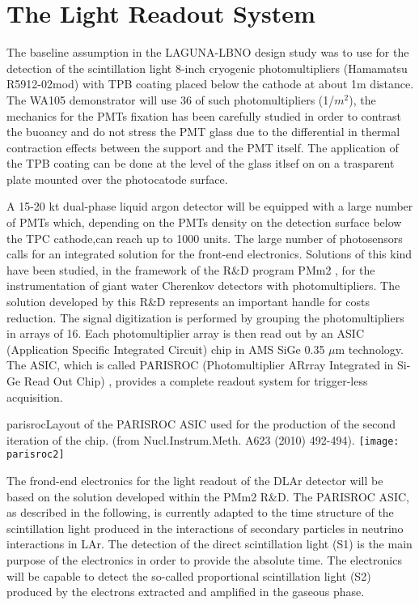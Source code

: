 \section{The Light Readout System} 
\label{sec:detectors-fd-alt-light}

The baseline assumption in the LAGUNA-LBNO design study was to use for the detection of the scintillation light 8-inch cryogenic photomultipliers (Hamamatsu R5912-02mod) with TPB coating placed below the cathode at about 1m distance. The WA105 demonstrator will use 36 of such photomultipliers (1/$m^2$), the mechanics for the PMTs fixation has been carefully studied in order to contrast the buoancy and do not stress the PMT glass due to the differential in thermal contraction effects between the support and the PMT itself. The application of the TPB coating can be done at the level of the glass itlsef on on a trasparent plate mounted over the photocatode surface.

A 15-20 kt dual-phase liquid argon detector will be equipped with a large number of PMTs which, depending on the PMTs density on the detection surface below the TPC cathode,can reach up to 1000 units. The large number of photosensors calls for an integrated solution for the front-end electronics.
Solutions of this kind have been studied, in the framework of the R\&D program PMm2 \cite{PMM2-1, PMM2-2}, for the instrumentation of giant water
Cherenkov detectors with photomultipliers. The solution developed by this R\&D represents an
important handle for costs reduction. The signal digitization is performed by grouping the
photomultipliers in arrays of 16. Each photomultiplier array is then read out by an ASIC
(Application Specific Integrated Circuit) chip in AMS SiGe 0.35 $\mu$m technology. The ASIC,
which is called PARISROC (Photomultiplier ARrray Integrated in Si-Ge Read Out Chip) 
\cite{Parisroc}, provides a complete readout system for trigger-less acquisition.

\begin{cdrfigure}{parisroc}{Layout of the PARISROC ASIC used for the production of the second iteration of the
chip. (from Nucl.Instrum.Meth. A623 (2010) 492-494).}
 \texttt{[image: parisroc2]}  
\end{cdrfigure}

The frond-end electronics for the light readout of the DLAr detector will be based on the solution 
developed within the PMm2 R\&D. The PARISROC ASIC, as described in the following, is currently adapted to the 
time structure of the scintillation light produced in the interactions of secondary particles in neutrino interactions in LAr. 
The detection of the direct scintillation light (S1) is the main purpose of the electronics in order to provide the absolute time.
The electronics will be capable to detect the so-called proportional scintillation light (S2) produced by the electrons extracted and amplified in the gaseous phase.

